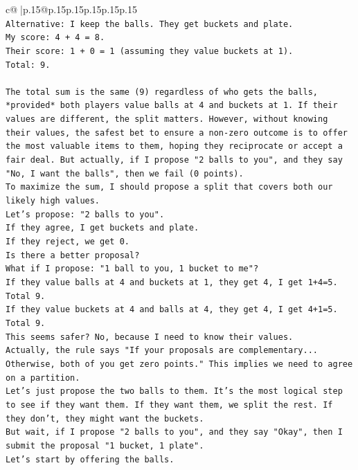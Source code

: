 \documentclass{article}
\begin{document}
{\begin{supertabular}{c@{$\;$}|p{.15\linewidth}@{}p{.15\linewidth}p{.15\linewidth}p{.15\linewidth}p{.15\linewidth}p{.15\linewidth}}
{{{\\ 
\texttt{Alternative: I keep the balls. They get buckets and plate.} \\
\texttt{My score: 4 + 4 = 8.} \\
\texttt{Their score: 1 + 0 = 1 (assuming they value buckets at 1).} \\
\texttt{Total: 9.} \\
\\ 
\texttt{The total sum is the same (9) regardless of who gets the balls, *provided* both players value balls at 4 and buckets at 1. If their values are different, the split matters. However, without knowing their values, the safest bet to ensure a non{-}zero outcome is to offer the most valuable items to them, hoping they reciprocate or accept a fair deal. But actually, if I propose "2 balls to you", and they say "No, I want the balls", then we fail (0 points).} \\
\texttt{To maximize the sum, I should propose a split that covers both our likely high values.} \\
\texttt{Let's propose: "2 balls to you".} \\
\texttt{If they agree, I get buckets and plate.} \\
\texttt{If they reject, we get 0.} \\
\texttt{Is there a better proposal?} \\
\texttt{What if I propose: "1 ball to you, 1 bucket to me"?} \\
\texttt{If they value balls at 4 and buckets at 1, they get 4, I get 1+4=5. Total 9.} \\
\texttt{If they value buckets at 4 and balls at 4, they get 4, I get 4+1=5. Total 9.} \\
\texttt{This seems safer? No, because I need to know their values.} \\
\texttt{Actually, the rule says "If your proposals are complementary... Otherwise, both of you get zero points." This implies we need to agree on a partition.} \\
\texttt{Let's just propose the two balls to them. It's the most logical step to see if they want them. If they want them, we split the rest. If they don't, they might want the buckets.} \\
\texttt{But wait, if I propose "2 balls to you", and they say "Okay", then I submit the proposal "1 bucket, 1 plate".} \\
\texttt{Let's start by offering the balls.} \\
\\ 
}}}
\end{supertabular}}
\end{document}
